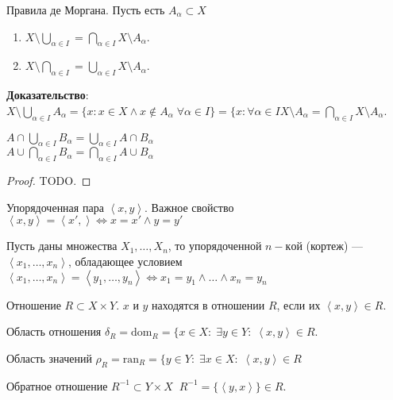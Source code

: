 Правила де Моргана. Пусть есть $A_\alpha \subset X$
 \begin{enumerate}
     \item $X \setminus \bigcup_{\alpha \in I} = \bigcap_{\alpha \in I} X \setminus A_\alpha$.
     \item $X \setminus \bigcap_{\alpha \in I} = \bigcup_{\alpha \in I} X \setminus A_\alpha$.
\end{enumerate}
\textbf{Доказательство}: $X \setminus \bigcup_{\alpha \in I} A_{\alpha} = \{x: x \in X \land x \notin A_{\alpha} \; \forall \alpha \in I\} = \{x: \forall \alpha \in I X \setminus A_{\alpha} = \bigcap_{\alpha \in I} X \setminus A_{\alpha}$.
\begin{theorem}
    $A \cap \bigcup_{\alpha \in I} B_\alpha = \bigcup_{\alpha \in I} A \cap B_\alpha$\\
    $A \cup \bigcap_{\alpha \in I} B_\alpha = \bigcap_{\alpha \in I} A \cup B_\alpha$\\
\end{theorem}
\begin{proof}
    TODO.
\end{proof}
 \begin{definition}
    Упорядоченная пара $\left<x,y\right>$. Важное свойство $\left<x, y\right> = \left<x',\right> \iff x = x' \land y = y'$
\end{definition}
\begin{definition}
    Пусть даны множества $X_1,\ldots,X_n$, то упорядоченной $n-кой$ (кортеж) ---  $\left<x_1,\ldots,x_n\right>$, обладающее условием $\left<x_1,\ldots,x_n\right> = \left<y_1,\ldots,y_n\right> \iff x_1 = y_1 \land \ldots \land x_n = y_n$ 
\end{definition}
\begin{definition}
    Отношение $R \subset X \times Y$. $x$ и $y$ находятся в отношении $R$, если их $\left<x, y\right> \in R$.
\end{definition}
\begin{definition}
    Область отношения $\delta_R = \text{dom}_R = \{x \in X: \; \exists y \in Y: \; \left<x, y\right> \in R$.
\end{definition}
 \begin{definition}
     Область значений $\rho_R = \text{ran}_R = \{y \in Y: \; \exists x \in X: \; \left<x, y\right> \in R$
\end{definition}
\begin{definition}
    Обратное отношение $R^{-1} \subset Y \times X \; \; R^{-1} = \{\left<y,x\right>\} \in R$.
\end{definition}
